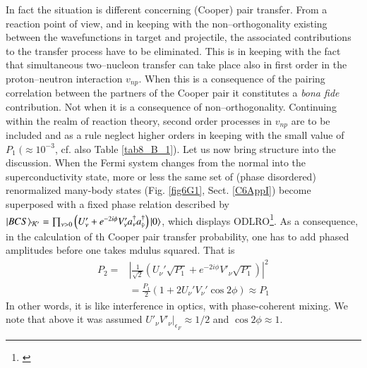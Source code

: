 In fact the situation is  different concerning (Cooper) pair transfer. From a reaction point of view, and in keeping with the non--orthogonality existing between the wavefunctions in target and projectile, the associated contributions to the transfer process have to be eliminated. This is in keeping with the fact that simultaneous two--nucleon transfer can take place also in first order in the proton--neutron interaction     $v_{np}$. When this is a consequence of the pairing correlation between the partners of the Cooper pair  it constitutes a \emph{bona fide} contribution. Not when it is a consequence of non--orthogonality. Continuing within the realm of reaction theory, second order processes in $v_{np}$ are to be included  and as a rule neglect higher orders in keeping with the small value of $P_1 \;(\approx10^{-3}$, cf. also Table \ref{tab8_B_1}). Let us now bring structure into the discussion. When the Fermi system changes from the normal into the superconductivity state, more or less the same set of (phase disordered) renormalized many-body states (Fig. \ref{fig6G1}, Sect. \ref{C6AppI}) become superposed with a fixed phase relation described by $|{BCS} \rangle_{\mathcal K'}=\prod_{\nu>0}\left(U'_\nu+e^{-2i\phi} V'_\nu a_\nu^\dagger a^\dagger_{\tilde\nu}\right)|{0} \rangle$, which displays ODLRO\footnote{\cite{Yang:62}}. As a consequence, in the calculation of th Cooper pair transfer probability, one has to add phased amplitudes before one takes mdulus squared. That is
\begin{align}\label{eq3.2.19}
\nonumber P_2=&\left|\frac{1}{\sqrt{2}}\left(U_\nu'\sqrt{P_1}+e^{-2i\phi}V'_\nu\sqrt{P_1}\right)\right|^2\\
&=\frac{P_1}{2}  \left(1+2U_\nu'V_\nu'\cos2\phi\right)\approx P_1
\end{align}
In other words, it is like interference in optics, with phase-coherent mixing. We note that above it was assumed $U'_\nu V'_\nu|_{\epsilon_F}\approx1/2$ and $\cos2\phi\approx1$.
